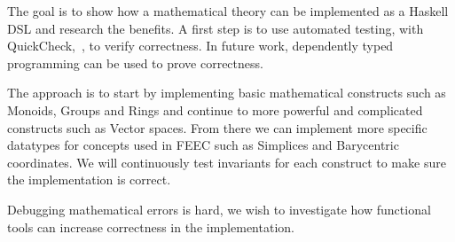 \documentclass{scrartcl}
\begin{document}

The goal is to show how a mathematical theory can be implemented as a Haskell
DSL and research the benefits. A first step is to use automated testing, with
QuickCheck,~\cite{claessen_quickcheck_2000}, to verify correctness. In future
work, dependently typed programming can be used to prove correctness.




The approach is to start by implementing basic mathematical constructs such as
Monoids, Groups and Rings and continue to more powerful and complicated
constructs such as Vector spaces. From there we can implement more specific
datatypes for concepts used in FEEC such as Simplices and Barycentric
coordinates. We will continuously test invariants for each construct to make sure
the implementation is correct.

Debugging mathematical errors is hard, we wish to investigate how functional
tools can increase correctness in the implementation.
















\end{document}
